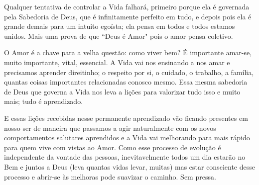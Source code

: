 \emdash{}Qualquer tentativa de controlar a Vida falhará, primeiro porque ela é governada pela Sabedoria de Deus, que é infinitamente perfeito em tudo, e depois pois ela é grande demais para um intuito egoísta; ela pensa em todos e todos estamos unidos. Mais uma prova de que ``Deus é Amor" pois o amor pensa coletivo.

\emdash{}O Amor é a chave para a velha questão: como viver bem? É importante amar-se, muito importante, vital, essencial. A Vida vai nos ensinando a nos amar e precisamos aprender direitinho; o respeito por si, o cuidado, o trabalho, a família, quantas coisas importantes relacionadas conosco mesmo. Essa mesma sabedoria de Deus que governa a Vida nos leva a lições para valorizar tudo isso e muito mais; tudo é aprendizado.

\emdash{}E essas lições recebidas nesse permanente aprendizado vão ficando presentes em nosso ser de maneira que passamos a agir naturalmente com os novos comportamentos salutares aprendidos e a Vida vai melhorando para mais rápido para quem vive com vistas ao Amor. Como esse processo de evolução é independente da vontade das pessoas, inevitavelmente todos um dia estarão no Bem e juntos a Deus (leva quantas vidas levar, muitas) mas estar consciente desse processo e abrir-se às melhoras pode suavizar o caminho. Sem pressa.


